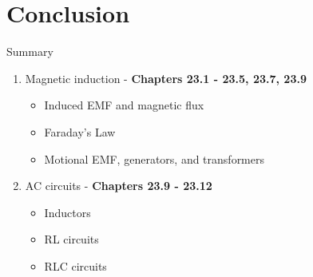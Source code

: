 \documentclass{beamer}
\begin{document}
\section{Conclusion}

\begin{frame}{Summary}
\begin{enumerate}
\item Magnetic induction - \textbf{Chapters 23.1 - 23.5, 23.7, 23.9}
\begin{itemize}
\item Induced EMF and magnetic flux
\item Faraday's Law
\item Motional EMF, generators, and transformers
\end{itemize}
\item AC circuits - \textbf{Chapters 23.9 - 23.12}
\begin{itemize}
\item Inductors
\item RL circuits
\item RLC circuits
\end{itemize}
\end{enumerate}
\end{frame}
\end{document}
